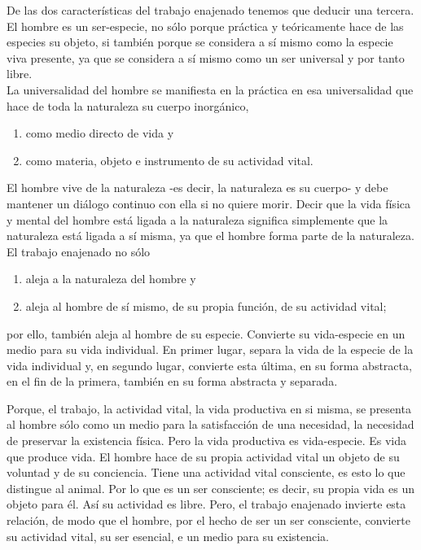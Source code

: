 De las dos características del trabajo enajenado tenemos que deducir una tercera.\\

El hombre es un ser-especie, no sólo porque práctica y teóricamente hace de las especies su objeto, si también porque se considera a sí mismo como la especie viva presente, ya que se considera a sí mismo como un ser universal y por tanto libre.\\

La universalidad del hombre se manifiesta en la práctica en esa universalidad que hace de toda la naturaleza su cuerpo inorgánico, 

\begin{enumerate}[1.]
    \item como medio directo de vida y 
    \item como materia, objeto e instrumento de su actividad vital.
\end{enumerate}

El hombre vive de la naturaleza -es decir, la naturaleza es su cuerpo- y debe mantener un diálogo continuo con ella si no quiere morir. Decir que la vida física y mental del hombre está ligada a la naturaleza significa simplemente que la naturaleza está ligada a sí misma, ya que el hombre forma parte de la naturaleza.\\

El trabajo enajenado no sólo 

\begin{enumerate}[1.]
    \item aleja a la naturaleza del hombre y 
    \item aleja al hombre de sí mismo, de su propia función, de su actividad vital; 
\end{enumerate}
por ello, también aleja al hombre de su especie. Convierte su vida-especie en un medio para su vida individual. En primer lugar, separa la vida de la especie de la vida individual y, en segundo lugar, convierte esta última, en su forma abstracta, en el fin de la primera, también en su forma abstracta y separada.

Porque, el trabajo, la actividad vital, la vida productiva en si misma, se presenta al hombre sólo como un medio para la satisfacción de una necesidad, la necesidad de preservar la existencia física. Pero la vida productiva es vida-especie. Es vida que produce vida. El hombre hace de su propia actividad vital un objeto de su voluntad y de su conciencia. Tiene una actividad vital consciente, es esto lo que distingue al animal. Por lo que es un ser consciente; es decir, su propia vida es un objeto para él. Así su actividad es libre. Pero, el trabajo enajenado invierte esta relación, de modo que el hombre, por el hecho de ser un ser consciente, convierte su actividad vital, su ser esencial, e un medio para su existencia. \\


